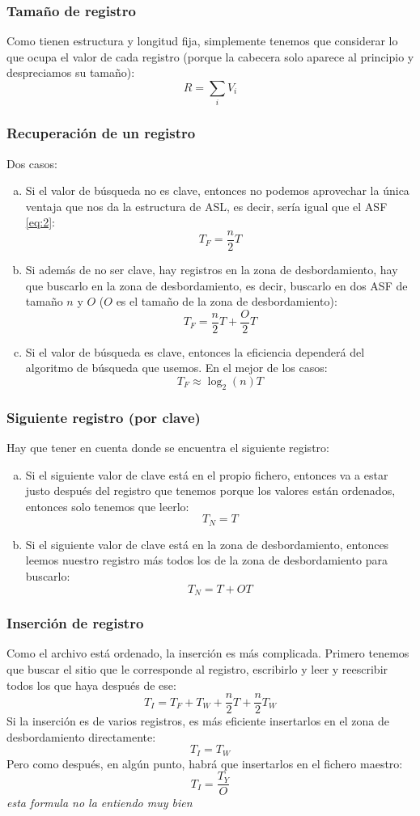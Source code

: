 \subsubsection{Tamaño de registro}

Como tienen estructura y longitud fija, simplemente tenemos que considerar lo que ocupa el valor de cada registro (porque la cabecera solo aparece al principio y despreciamos su tamaño):
\[
R=\sum_{i}V_i
\]

\subsubsection{Recuperación de un registro}
Dos casos:
\begin{enumerate}[(a)]
\item Si el valor de búsqueda no es clave, entonces no podemos aprovechar la única ventaja que nos da la estructura de ASL, es decir, sería igual que el ASF \eqref{eq:2}:
\[
T_F=\frac{n}{2}T
\]
\item Si además de no ser clave, hay registros en la zona de desbordamiento, hay que buscarlo en la zona de desbordamiento, es decir, buscarlo en dos ASF de tamaño $n$ y $O$ ($O$ es el tamaño de la zona de desbordamiento):
\[
T_F=\frac{n}{2}T+\frac{O}{2}T
\] 
\item Si el valor de búsqueda es clave, entonces la eficiencia dependerá del algoritmo de búsqueda que usemos. En el mejor de los casos:
\[
T_F\approx \log_2(n)T
\]
\end{enumerate}
\subsubsection{Siguiente registro (por clave)}
Hay que tener en cuenta donde se encuentra el siguiente registro:
\begin{enumerate}[(a)]
\item Si el siguiente valor de clave está en el propio fichero, entonces va a estar justo después del registro que tenemos porque los valores están ordenados, entonces solo tenemos que leerlo:
\[
T_N=T
\]
\item Si el siguiente valor de clave está en la zona de desbordamiento, entonces leemos nuestro registro más todos los de la zona de desbordamiento para buscarlo:
\[
T_N=T+OT
\]
\end{enumerate}
\subsubsection{Inserción de registro}
Como el archivo está ordenado, la inserción es más complicada. Primero tenemos que buscar el sitio que le corresponde al registro, escribirlo y leer y reescribir todos los que haya después de ese:
\[
T_I=T_F+T_W+\frac{n}{2}T+\frac{n}{2}T_W
\]
Si la inserción es de varios registros, es más eficiente insertarlos en el zona de desbordamiento directamente:
\[
T_I=T_W
\]
Pero como después, en algún punto, habrá que insertarlos en el fichero maestro:
\[
T_I=\frac{T_Y}{O}
\]
\textit{esta formula no la entiendo muy bien}
